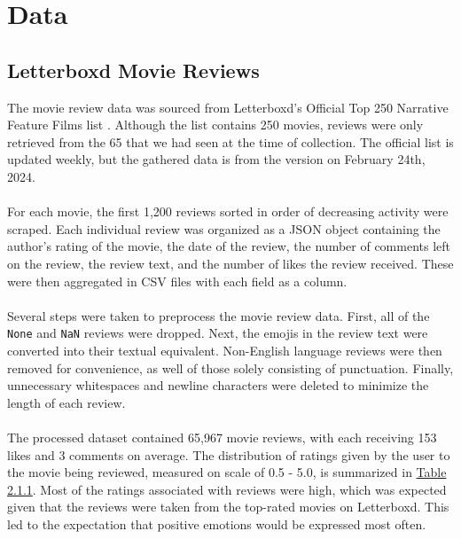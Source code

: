 \documentclass[11pt]{article}
\begin{document}
\section{Data}
\subsection{Letterboxd Movie Reviews}
The movie review data was sourced from Letterboxd's Official Top 250 Narrative Feature Films list \cite{Vis}. Although the list contains 250 movies, reviews were only retrieved from the 65 that we had seen at the time of collection. The official list is updated weekly, but the gathered data is from the version on February 24th, 2024. \\ \\
For each movie, the first 1,200 reviews sorted in order of decreasing activity were scraped. Each individual review was organized as a JSON object containing the author's rating of the movie, the date of the review, the number of comments left on the review, the review text, and the number of likes the review received. These were then aggregated in CSV files with each field as a column. \\ \\
Several steps were taken to preprocess the movie review data. First, all of the \texttt{None} and \texttt{NaN} reviews were dropped. Next, the emojis in the review text were converted into their textual equivalent. Non-English language reviews were then removed for convenience, as well of those solely consisting of punctuation. Finally, unnecessary whitespaces and newline characters were deleted to minimize the length of each review. \\ \\
The processed dataset contained 65,967 movie reviews, with each receiving 153 likes and 3 comments on average. The distribution of ratings given by the user to the movie being reviewed, measured on scale of 0.5 - 5.0, is summarized in \hyperref[tab:review_rating_distribution]{Table 2.1.1}. Most of the ratings associated with reviews were high, which was expected given that the reviews were taken from the top-rated movies on Letterboxd. This led to the expectation that positive emotions would be expressed most often.
\renewcommand{\thetable}{2.1.1}
\end{document}
